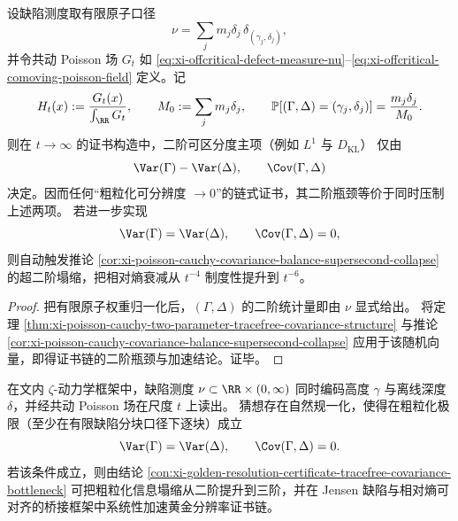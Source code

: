 \begin{conclusion}\label{con:xi-golden-resolution-certificate-tracefree-covariance-bottleneck}
设缺陷测度取有限原子口径
\[
\nu=\sum_j m_j\delta_j\,\delta_{(\gamma_j,\delta_j)},
\]
并令共动 Poisson 场 \(G_t\) 如
\eqref{eq:xi-offcritical-defect-measure-nu}--\eqref{eq:xi-offcritical-comoving-poisson-field}
定义。记
\[
H_t(x):=\frac{G_t(x)}{\int_{\RR}G_t},\qquad
M_0:=\sum_j m_j\delta_j,\qquad
\mathbb P\!\left[(\Gamma,\Delta)=(\gamma_j,\delta_j)\right]=\frac{m_j\delta_j}{M_0}.
\]
则在 \(t\to\infty\) 的证书构造中，二阶可区分度主项（例如 \(L^1\) 与 \(D_{\mathrm{KL}}\)）
仅由
\[
\Var(\Gamma)-\Var(\Delta),\qquad
\Cov(\Gamma,\Delta)
\]
决定。因而任何“粗粒化可分辨度 \(\to0\)”的链式证书，其二阶瓶颈等价于同时压制上述两项。
若进一步实现
\[
\Var(\Gamma)=\Var(\Delta),\qquad \Cov(\Gamma,\Delta)=0,
\]
则自动触发推论
\ref{cor:xi-poisson-cauchy-covariance-balance-supersecond-collapse}
的超二阶塌缩，把相对熵衰减从 \(t^{-4}\) 制度性提升到 \(t^{-6}\)。
\end{conclusion}
\begin{proof}
把有限原子权重归一化后，\((\Gamma,\Delta)\) 的二阶统计量即由 \(\nu\) 显式给出。
将定理
\ref{thm:xi-poisson-cauchy-two-parameter-tracefree-covariance-structure}
与推论
\ref{cor:xi-poisson-cauchy-covariance-balance-supersecond-collapse}
应用于该随机向量，即得证书链的二阶瓶颈与加速结论。证毕。
\end{proof}
\begin{conjecture}\label{conj:xi-zeta-comoving-defect-measure-covariance-balance}
在文内 \(\zeta\)-动力学框架中，缺陷测度
\(
\nu\subset\RR\times(0,\infty)
\)
同时编码高度 \(\gamma\) 与离线深度 \(\delta\)，并经共动 Poisson 场在尺度 \(t\) 上读出。
猜想存在自然规一化，使得在粗粒化极限（至少在有限缺陷分块口径下逐块）成立
\[
\Var(\Gamma)=\Var(\Delta),\qquad
\Cov(\Gamma,\Delta)=0.
\]
若该条件成立，则由结论
\ref{con:xi-golden-resolution-certificate-tracefree-covariance-bottleneck}
可把粗粒化信息塌缩从二阶提升到三阶，并在 Jensen 缺陷与相对熵可对齐的桥接框架中系统性加速黄金分辨率证书链。
\end{conjecture}
\endinput
